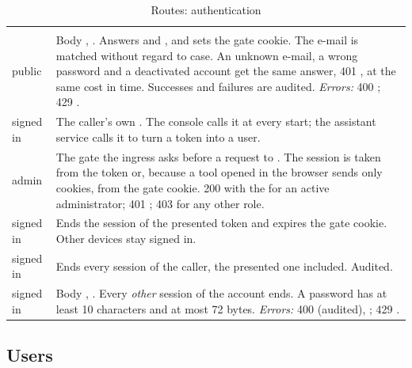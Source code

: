 \begin{xltabular}{\textwidth}{@{}L{19mm}Y@{}}
\caption{Routes: authentication}\label{tab:api:auth}\\
\toprule {} &  \\ \midrule \endfirsthead
\toprule {} &  \\ \midrule \endhead
\bottomrule \endlastfoot
{}
public & Body , . Answers  and , and sets the
  gate cookie. The e-mail is matched without regard to case. An unknown e-mail, a wrong
  password and a deactivated account get the same answer, 401 , at
  the same cost in time. Successes and failures are audited. \emph{Errors:} 400
  ; 429 . \\
\addlinespace
{}
signed in & The caller's own . The console calls it at every start; the assistant
  service calls it to turn a token into a user. \\
\addlinespace
{}
admin & The gate the ingress asks before a request to . The session is taken
  from the token or, because a tool opened in the browser sends only cookies, from the gate
  cookie. 200 with the  for an active administrator; 401 ; 403
   for any other role. \\
\addlinespace
{}
signed in & Ends the session of the presented token and expires the gate cookie. Other devices
  stay signed in. \\
\addlinespace
{}
signed in & Ends every session of the caller, the presented one included. Audited. \\
\addlinespace
{}
signed in & Body , . Every \emph{other} session of the
  account ends. A password has at least 10 characters and at most 72 bytes. \emph{Errors:} 400
   (audited), ; 429 . \\
\end{xltabular}

\subsection{Users}\label{sec:api:users}

